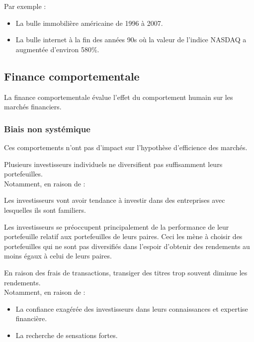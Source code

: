 \documentclass[10pt, french]{article}
\begin{document}
\begin{multicols*}{2}
Par exemple : 
\begin{itemize}
	\item	La bulle immobilière américaine de 1996 à 2007.
	\item	La bulle internet à la fin des années 90s où la valeur de l'indice NASDAQ a augmentée d'environ 580\%.
\end{itemize}


\columnbreak
\subsection{Finance comportementale}
La finance comportementale évalue l'effet du comportement humain sur les marchés financiers.

\subsubsection{Biais non systémique}
Ces comportements n'ont pas d'impact sur l'hypothèse d'efficience des marchés.

\begin{definitionNOHFILLsub}
Plusieurs investisseurs individuels ne diversifient pas suffisamment leurs portefeuilles. \\

Notamment, en raison de : 
\begin{definitionNOHFILLprop}
Les investisseurs vont avoir tendance à investir dans des entreprises avec lesquelles ils sont familiers.
\end{definitionNOHFILLprop}

\begin{definitionNOHFILLprop}
Les investisseurs se préoccupent principalement de la performance de leur portefeuille relatif aux portefeuilles de leurs paires. Ceci les mène à choisir des portefeuilles qui ne sont pas diversifiés dans l'espoir d'obtenir des rendements au moins égaux à celui de leurs paires.
\end{definitionNOHFILLprop}
\end{definitionNOHFILLsub}

\begin{definitionNOHFILLsub}
En raison des frais de transactions, transiger des titres trop souvent diminue les rendements. 	\\

Notamment, en raison de : 
\begin{itemize}
	\item	La confiance exagérée des investisseurs dans leurs connaissances et expertise financière.
	\item	La recherche de sensations fortes.
\end{itemize}
\end{definitionNOHFILLsub}


\end{multicols*}
\end{document}
